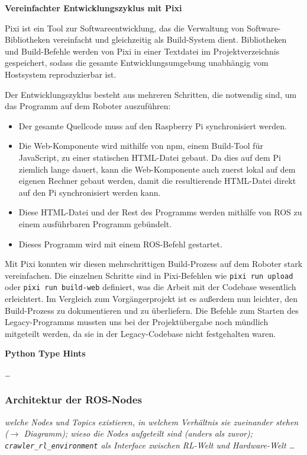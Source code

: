 \textbf{Vereinfachter Entwicklungszyklus mit Pixi}

Pixi ist ein Tool zur Softwareentwicklung, das die Verwaltung von Software-Bibliotheken vereinfacht und gleichzeitig als Build-System dient. Bibliotheken und Build-Befehle werden von Pixi in einer Textdatei im Projektverzeichnis gespeichert, sodass die gesamte Entwicklungsumgebung unabhängig vom Hostsystem reproduzierbar ist.

Der Entwicklungszyklus besteht aus mehreren Schritten, die notwendig sind, um das Programm auf dem Roboter auszuführen:
\begin{itemize}
	\item Der gesamte Quellcode muss auf den Raspberry Pi synchronisiert werden.
	\item Die Web-Komponente wird mithilfe von npm, einem Build-Tool für JavaScript, zu einer statischen HTML-Datei gebaut. Da dies auf dem Pi ziemlich lange dauert, kann die Web-Komponente auch zuerst lokal auf dem eigenen Rechner gebaut werden, damit die resultierende HTML-Datei direkt auf den Pi synchronisiert werden kann.
	\item Diese HTML-Datei und der Rest des Programms werden mithilfe von ROS zu einem ausführbaren Programm gebündelt.
	\item Dieses Programm wird mit einem ROS-Befehl gestartet.
\end{itemize}

Mit Pixi konnten wir diesen mehrschrittigen Build-Prozess auf dem Roboter stark vereinfachen. Die einzelnen Schritte sind in Pixi-Befehlen wie \texttt{pixi run upload} oder \texttt{pixi run build-web} definiert, was die Arbeit mit der Codebase wesentlich erleichtert. Im Vergleich zum Vorgängerprojekt ist es außerdem nun leichter, den Build-Prozess zu dokumentieren und zu überliefern. Die Befehle zum Starten des Legacy-Programms mussten uns bei der Projektübergabe noch mündlich mitgeteilt werden, da sie in der Legacy-Codebase nicht festgehalten waren. 

\textbf{Python Type Hints}

\textit{\dots}

\subsubsection{Architektur der ROS-Nodes}

\textit{welche Nodes und Topics existieren, in welchem Verhältnis sie zueinander stehen ($\rightarrow$ Diagramm); wieso die Nodes aufgeteilt sind (anders als zuvor); \texttt{crawler\_rl\_environment} als Interface zwischen RL-Welt und Hardware-Welt \dots}

